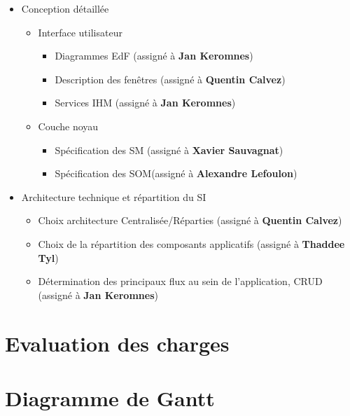 \begin{itemize}
\begin{itemize}
\end{itemize}

\item Conception détaillée

\begin{itemize}
\item Interface utilisateur

\begin{itemize}
\item Diagrammes EdF (assigné à \textbf{Jan Keromnes})
\item Description des fenêtres (assigné à \textbf{Quentin Calvez})
\item Services IHM (assigné à \textbf{Jan Keromnes})
\end{itemize}

\item Couche noyau

\begin{itemize}
\item Spécification des SM (assigné à \textbf{Xavier Sauvagnat})
\item Spécification des SOM(assigné à \textbf{Alexandre Lefoulon})
\end{itemize}

\end{itemize}

\item Architecture technique et répartition du SI

\begin{itemize}
\item Choix architecture Centralisée/Réparties (assigné à \textbf{Quentin Calvez})
\item Choix de la répartition des composants applicatifs (assigné à \textbf{Thaddee Tyl})
\item Détermination des principaux flux au sein de l'application, CRUD (assigné à \textbf{Jan Keromnes})
\end{itemize}

\end{itemize}

\section{Evaluation des charges}

\section{Diagramme de Gantt}

